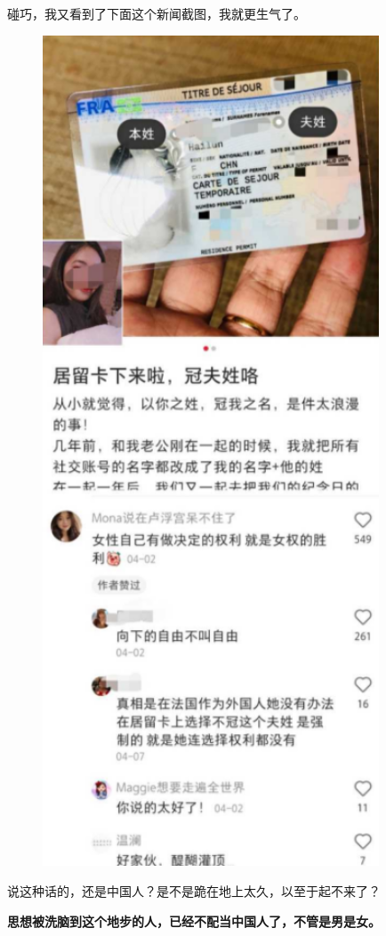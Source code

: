 \documentclass[UTF8, 11pt, oneside]{ctexart}
\newcommand{\zd}[1]{\textbf{\textcolor[RGB]{123,12,0}{#1}}} %
\begin{document}
碰巧，我又看到了下面这个新闻截图，我就更生气了。

\begin{figure}[H]
    \centering
    \includegraphics[width=10cm]{2023-03-30-002}
\end{figure}

说这种话的，还是中国人？是不是跪在地上太久，以至于起不来了？

\zd{思想被洗脑到这个地步的人，已经不配当中国人了，不管是男是女。}
\end{document}

